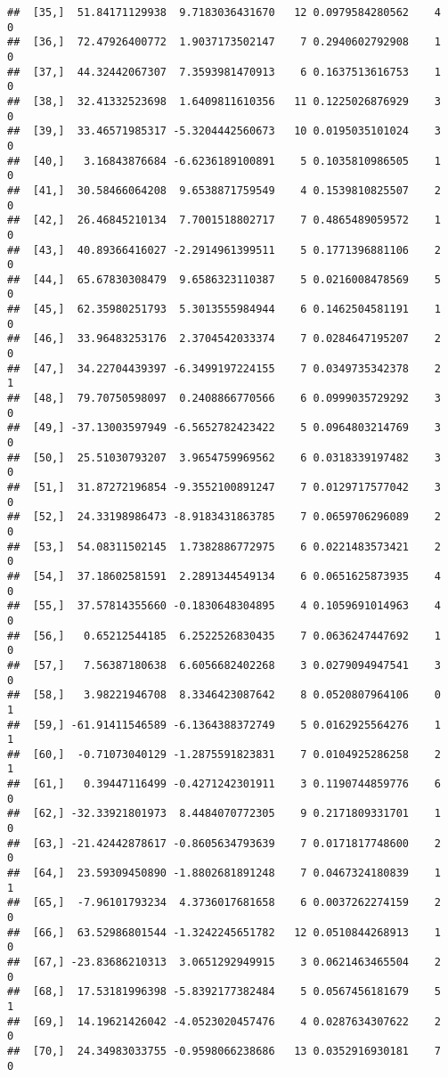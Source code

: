 \documentclass[]{article}
\begin{document}
\begin{verbatim}
##  [35,]  51.84171129938  9.7183036431670   12 0.0979584280562    4    0
##  [36,]  72.47926400772  1.9037173502147    7 0.2940602792908    1    0
##  [37,]  44.32442067307  7.3593981470913    6 0.1637513616753    1    0
##  [38,]  32.41332523698  1.6409811610356   11 0.1225026876929    3    0
##  [39,]  33.46571985317 -5.3204442560673   10 0.0195035101024    3    0
##  [40,]   3.16843876684 -6.6236189100891    5 0.1035810986505    1    0
##  [41,]  30.58466064208  9.6538871759549    4 0.1539810825507    2    0
##  [42,]  26.46845210134  7.7001518802717    7 0.4865489059572    1    0
##  [43,]  40.89366416027 -2.2914961399511    5 0.1771396881106    2    0
##  [44,]  65.67830308479  9.6586323110387    5 0.0216008478569    5    0
##  [45,]  62.35980251793  5.3013555984944    6 0.1462504581191    1    0
##  [46,]  33.96483253176  2.3704542033374    7 0.0284647195207    2    0
##  [47,]  34.22704439397 -6.3499197224155    7 0.0349735342378    2    1
##  [48,]  79.70750598097  0.2408866770566    6 0.0999035729292    3    0
##  [49,] -37.13003597949 -6.5652782423422    5 0.0964803214769    3    0
##  [50,]  25.51030793207  3.9654759969562    6 0.0318339197482    3    0
##  [51,]  31.87272196854 -9.3552100891247    7 0.0129717577042    3    0
##  [52,]  24.33198986473 -8.9183431863785    7 0.0659706296089    2    0
##  [53,]  54.08311502145  1.7382886772975    6 0.0221483573421    2    0
##  [54,]  37.18602581591  2.2891344549134    6 0.0651625873935    4    0
##  [55,]  37.57814355660 -0.1830648304895    4 0.1059691014963    4    0
##  [56,]   0.65212544185  6.2522526830435    7 0.0636247447692    1    0
##  [57,]   7.56387180638  6.6056682402268    3 0.0279094947541    3    0
##  [58,]   3.98221946708  8.3346423087642    8 0.0520807964106    0    1
##  [59,] -61.91411546589 -6.1364388372749    5 0.0162925564276    1    1
##  [60,]  -0.71073040129 -1.2875591823831    7 0.0104925286258    2    1
##  [61,]   0.39447116499 -0.4271242301911    3 0.1190744859776    6    0
##  [62,] -32.33921801973  8.4484070772305    9 0.2171809331701    1    0
##  [63,] -21.42442878617 -0.8605634793639    7 0.0171817748600    2    0
##  [64,]  23.59309450890 -1.8802681891248    7 0.0467324180839    1    1
##  [65,]  -7.96101793234  4.3736017681658    6 0.0037262274159    2    0
##  [66,]  63.52986801544 -1.3242245651782   12 0.0510844268913    1    0
##  [67,] -23.83686210313  3.0651292949915    3 0.0621463465504    2    0
##  [68,]  17.53181996398 -5.8392177382484    5 0.0567456181679    5    1
##  [69,]  14.19621426042 -4.0523020457476    4 0.0287634307622    2    0
##  [70,]  24.34983033755 -0.9598066238686   13 0.0352916930181    7    0

\end{verbatim}
\end{document}
